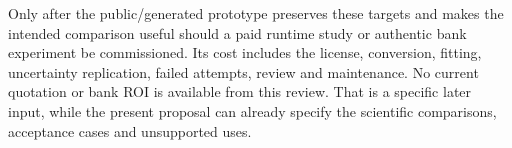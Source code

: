 Only after the public/generated prototype preserves these targets and makes
the intended comparison useful should a paid runtime study or authentic bank
experiment be commissioned. Its cost includes the license, conversion,
fitting, uncertainty replication, failed attempts, review and maintenance.
No current quotation or bank ROI is available from this review. That is a
specific later input, while the present proposal can already specify the
scientific comparisons, acceptance cases and unsupported uses.
\label{exec15:commercial-survival-end}
